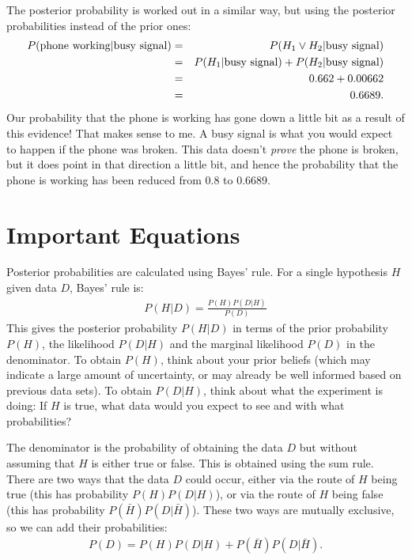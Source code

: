 The posterior probability is worked out in a similar way, but using the posterior
probabilities instead of the prior ones:
\begin{eqnarray}
P(\textnormal{phone working}|\textnormal{busy signal}) &=& P(H_1 \vee H_2 | \textnormal{busy signal})\\
&=& P(H_1|\textnormal{busy signal}) + P(H_2|\textnormal{busy signal})\\
&=& 0.662 + 0.00662\\
&=& 0.6689.
\end{eqnarray}
Our probability that the phone is working has gone down a little bit as a result of this
evidence! That makes sense to me. A busy signal is what you would expect to
happen if the phone was broken. This data doesn't {\it prove} the phone is
broken, but it does point in that direction a little bit, and hence the
probability that the phone is working has been reduced from 0.8 to 0.6689.

\section{Important Equations}
Posterior probabilities are calculated using Bayes' rule. For a single
hypothesis $H$ given data $D$, Bayes' rule is:
\begin{eqnarray}
P(H|D) = \frac{P(H)P(D|H)}{P(D)}\label{eq:bayes1}
\end{eqnarray}
This gives the posterior probability $P(H|D)$ in terms of the prior probability
$P(H)$, the likelihood $P(D|H)$ and the marginal likelihood $P(D)$ in the
denominator. To obtain $P(H)$, think about your prior beliefs (which may
indicate a large amount of uncertainty, or may already be well informed based
on previous data sets). To obtain $P(D|H)$, think about what the experiment is
doing: If $H$ is true, what data would you expect to see and with what
probabilities?

The denominator is the probability of obtaining the data $D$ but without
assuming that $H$ is either true or false. This is obtained using the sum rule.
There are two ways that the data $D$ could occur, either via the route of $H$
being true (this has probability $P(H)P(D|H)$), or via the route of $H$ being
false (this has probability $P(\bar{H})P(D|\bar{H})$). These two ways are
mutually exclusive, so we can add their probabilities:
\begin{eqnarray}
P(D) = P(H)P(D|H) + P(\bar{H})P(D|\bar{H}).
\end{eqnarray}

